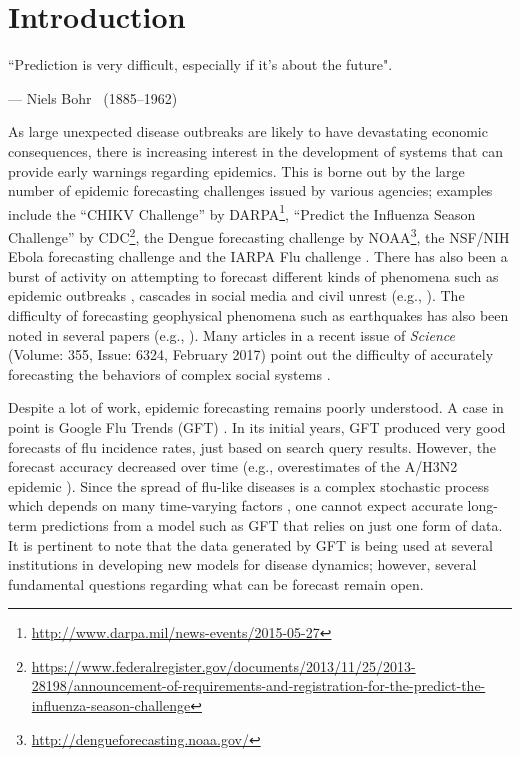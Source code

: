 \section{Introduction} \label{sec:intro}

\epigraph{``Prediction is very difficult, especially if it's about the future".}
{--- \textup{Niels Bohr~ (1885--1962)}}  

\medskip
As large unexpected disease outbreaks are likely to have 
devastating economic consequences, there is increasing interest in
the development of systems that can provide early warnings regarding
epidemics.
This is borne out by the large number of epidemic forecasting challenges 
issued by various agencies; examples include 
the ``CHIKV Challenge'' by 
DARPA\footnote{\url{http://www.darpa.mil/news-events/2015-05-27}},
``Predict the Influenza Season Challenge'' by 
CDC\footnote{\url{https://www.federalregister.gov/documents/2013/11/25/2013-28198/announcement-of-requirements-and-registration-for-the-predict-the-influenza-season-challenge}},
the Dengue forecasting challenge by 
NOAA\footnote{\url{http://dengueforecasting.noaa.gov/}},
the NSF/NIH Ebola forecasting challenge and 
the IARPA Flu challenge \cite{Muthaiah_etal_2016}.
There has also been a burst of activity on attempting to forecast different kinds of
phenomena such as epidemic outbreaks
\cite{nsoesie2013systematic,Nishiura:2011,Ohkusa:2011,Hall:2007,
Vespignani-BMC-2012, chakraborty:sdm14, Scarpino-Petri-2017},
cascades in social media and civil unrest
(e.g., \cite{Martin_etal_2016, Krishnan_etal_2016, Korkmaz_etal_2016,
Ramakrishnan:2014:BNE:2623330.2623373}).
The difficulty of forecasting geophysical phenomena 
such as earthquakes has also been noted in several papers
(e.g., \cite{Geller-1997,Geller-etal-1997}).
Many articles in a recent issue of \emph{Science} 
(Volume: 355, Issue: 6324, February 2017) point out
the difficulty of accurately forecasting the behaviors of
complex social systems \cite{Athey-2017,Bohannon-2017,Cederman-etal-2017,
Clauset-etal-2017,Hofman-etal-2017,Jasny-etal-2017,Kennedy-etal-2017,
Subrahmanian-etal-2017,Tetlock-etal-2017}.

\medskip
Despite a lot of work, epidemic forecasting remains poorly understood.  
A case in point is Google Flu Trends (GFT) 
\cite{ginsberg:nature08:flu-search-engine}. 
In its initial years, GFT
produced very good forecasts of flu incidence rates,
just based on search query results. 
However, the forecast accuracy decreased over time
(e.g., overestimates of the A/H3N2 epidemic
\cite{lazer:science14, olson:ploscb13}).
Since the spread of flu-like diseases is a complex stochastic process 
which depends on many time-varying factors \cite{Drake-2005, Drake-2006},
one cannot expect accurate long-term predictions
from a model such as GFT that relies on just one form of data.
It is pertinent to note that the data generated by GFT is being used at several 
institutions in developing new models for disease dynamics;
however, several fundamental questions regarding 
what can be forecast remain open.

